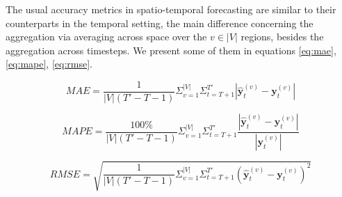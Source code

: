 The usual accuracy metrics in spatio-temporal forecasting are similar to their counterparts in the temporal setting, the main difference concerning the aggregation via averaging across space over the $v \in |V|$ regions, besides the aggregation across timesteps.
We present some of them in equations \ref{eq:mae}, \ref{eq:mape}, \ref{eq:rmse}.

\begin{equation}\label{eq:mae_multi}
    MAE = \frac{1}{|V|(T'-T-1)} \Sigma_{v=1}^{|V|} \Sigma_{t=T+1}^{T'} | \bm{\hat{y}}^{(v)}_{t} - \bm{y}_{t}^{(v)} |
\end{equation}


\begin{equation}\label{eq:mape_multi}
    MAPE = \frac{100\%}{|V|(T'-T-1)}\Sigma_{v=1}^{|V|} \Sigma_{t=T+1}^{T'} \frac{ | \bm{\hat{y}}^{(v)}_{t} - \bm{y}_{t}^{(v)} | }{ |\bm{y}_{t}^{(v)}| }
\end{equation}


\begin{equation}\label{eq:rmse_multi}
    RMSE = \sqrt{ \frac{1}{|V|(T'-T-1)} \Sigma_{v=1}^{|V|} \Sigma_{t=T+1}^{T'} (\bm{\hat{y}}^{(v)}_{t} - \bm{y}_{t}^{(v)})^2 }
\end{equation}

